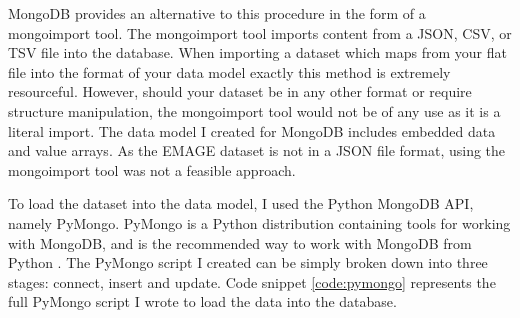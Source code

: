 MongoDB provides an alternative to this procedure in the form of a mongoimport tool. The mongoimport tool imports content from a JSON, CSV, or TSV file into the database. When importing a dataset which maps from your flat file into the format of your data model exactly this method is extremely resourceful. However, should your dataset be in any other format or require structure manipulation, the mongoimport tool would not be of any use as it is a literal import. The data model I created for MongoDB includes embedded data and value arrays. As the EMAGE dataset is not in a JSON file format, using the mongoimport tool was not a feasible approach.

To load the dataset into the data model, I used the Python MongoDB API, namely PyMongo. PyMongo is a Python distribution containing tools for working with MongoDB, and is the recommended way to work with MongoDB from Python \cite{md}. The PyMongo script I created can be simply broken down into three stages: connect, insert and update. Code snippet \ref{code:pymongo} represents the full PyMongo script I wrote to load the data into the database.\\[2em]

